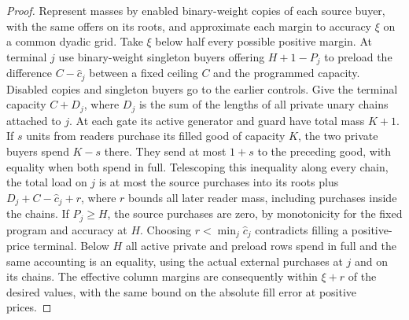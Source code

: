 \documentclass[11pt]{article}
\begin{document}
\begin{proof}
Represent masses by enabled binary-weight copies of each source buyer,
with the same offers on its roots, and approximate each margin to
accuracy \(\xi\) on a common dyadic grid. Take \(\xi\) below half every
possible positive margin. At terminal \(j\) use binary-weight singleton
buyers offering \(H+1-P_j\) to preload the difference
\(C-\widehat c_j\) between a fixed ceiling \(C\) and the programmed
capacity. Disabled copies and singleton buyers go to the earlier
controls. Give the terminal capacity \(C+D_j\), where \(D_j\) is the
sum of the lengths of all private unary chains attached to \(j\).
At each gate its active generator and guard have total mass \(K+1\).
If \(s\) units from readers purchase its filled good of capacity \(K\),
the two private buyers spend \(K-s\) there. They send at most \(1+s\)
to the preceding good, with equality when both spend in full.
Telescoping this inequality along every chain,
the total load on \(j\) is at most the source purchases into its roots
plus \(D_j+C-\widehat c_j+r\), where \(r\) bounds all later reader
mass, including purchases inside the chains. If \(P_j\ge H\), the source
purchases are zero, by monotonicity for the fixed program and accuracy
at \(H\). Choosing \(r<\min_j\widehat c_j\) contradicts filling a
positive-price terminal. Below \(H\) all active private and preload rows
spend in full and the same accounting is an equality, using the actual
external purchases at \(j\) and on its chains. The effective column
margins are consequently within \(\xi+r\) of the desired values, with
the same bound on the absolute fill error at positive prices.


\end{proof}
\end{document}
